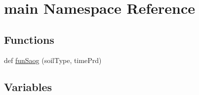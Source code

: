 \hypertarget{a00039}{}\section{main Namespace Reference}
\label{a00039}
\subsection*{Functions}
\begin{DoxyCompactItemize}
\item 
def \hyperlink{a00039_a4f60afd2426ee9409955e4352b3f0486}{fun\+Saog} (soil\+Type, time\+Prd)
\end{DoxyCompactItemize}
\subsection*{Variables}
